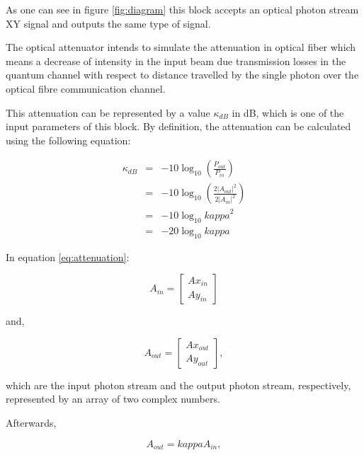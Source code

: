 As one can see in figure \ref{fig:diagram} this block accepts an optical photon stream XY signal and outputs the same type of signal.

The optical attenuator intends to simulate the attenuation in optical fiber which means a decrease of intensity in the input beam due transmission losses in the quantum channel with respect to distance travelled by the single photon over the optical fibre communication channel.

This attenuation can be represented by a value $\kappa_{dB}$ in dB, which is one of the input parameters of this block. By definition, the attenuation can be calculated using the following equation:

\begin{eqnarray}
\label{eq:attenuation}
  \kappa_{dB}   &=& -10 \log_{10}\left(\frac{P_{out}}{P_{in}}\right) \\
  \nonumber
                &=& -10 \log_{10}\left(\frac{2|A_{out}|^2}{2|A_{in}|^2}\right) \\
  \nonumber
                &=& -10 \log_{10} \textit{kappa}^2 \\
  \nonumber
                &=& -20 \log_{10} \textit{kappa}
\end{eqnarray}

In equation \ref{eq:attenuation}:

\begin{equation*}
  A_{in} = \left[
  \begin{array}{c}
    Ax_{in} \\
    Ay_{in}
  \end{array} \right]
\end{equation*}

and, 

\begin{equation*}
  A_{out} = \left[
  \begin{array}{c}
    Ax_{out} \\
    Ay_{out}
  \end{array} \right],
\end{equation*}

which are the input photon stream and the output photon stream, respectively, represented by an array of two complex numbers.

Afterwards,

\begin{equation}\label{eq:relation}
  A_{out} = \textit{kappa} A_{in},
\end{equation}

